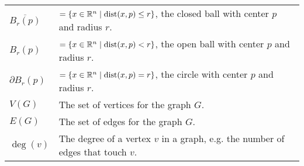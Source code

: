 \begin{table}[H]
\begin{tabular}{ll}
$\overline{B_r(p)}$ & $ = \{x \in \mathbb{R}^n \mid \operatorname{dist}(x, p) \leq r\}$, the closed ball with center $p$ and radius $r$. \\
$B_r(p)$ & $ = \{x \in \mathbb{R}^n \mid \operatorname{dist}(x, p) < r\}$, the open ball with center $p$ and radius $r$. \\
$\partial{B_r(p)}$ & $ = \{x \in \mathbb{R}^n \mid \operatorname{dist}(x, p) = r\}$, the circle with center $p$ and radius $r$. \\
$V(G)$ & The set of vertices for the graph $G$. \\
$E(G)$ & The set of edges for the graph $G$. \\
$\deg(v)$ & The degree of a vertex $v$ in a graph, e.g. the number of edges that touch $v$.
\end{tabular}
\end{table}